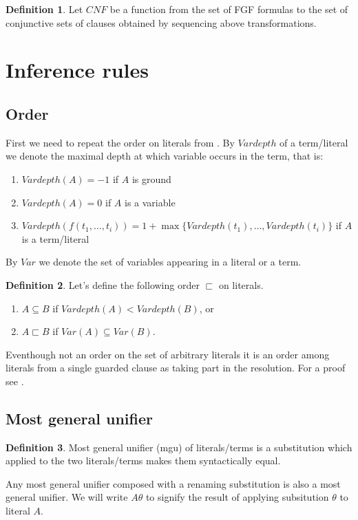 \documentclass[english, shortabstract]{iithesis}
\theoremstyle{definition} \newtheorem{definition}{Definition}[chapter]
\theoremstyle{remark} \newtheorem{remark}[definition]{Observation}
\theoremstyle{plain} \newtheorem{theorem}[definition]{Theorem}
\theoremstyle{plain} \newtheorem{lemma}[definition]{Lemma}
\begin{document}
\begin{definition}
Let $CNF$ be a function from the set of FGF formulas to the set of conjunctive sets of clauses obtained by sequencing above transformations.
\end{definition}

\section{Inference rules}

\subsection{Order}

First we need to repeat the order on literals from \cite{resolution gf}.
By $Vardepth$ of a term/literal we denote the maximal depth at which variable occurs in the term, that is:
\begin{enumerate}
    \item $Vardepth(A)=-1$ if $A$ is ground
    \item $Vardepth(A)=0$ if $A$ is a variable
    \item $Vardepth(f(t_1,\dots, t_i))=1+\max\{Vardepth(t_1), \dots, Vardepth(t_i)\}$ if $A$ is a term/literal
\end{enumerate}
By $Var$ we denote the set of variables appearing in a literal or a term.
\begin{definition}
Let's define the following order $\sqsubset$ on literals.
\begin{enumerate}
    \item $A \subseteq B$ if $Vardepth(A) < Vardepth(B)$, or
    \item $A \sqsubset B$ if $Var(A) \subseteq Var(B)$.
\end{enumerate}
\end{definition}
Eventhough not an order on the set of arbitrary literals it is an order among literals from a single guarded clause as taking part in the resolution.
For a proof see \cite{resolution gf}.

\subsection{Most general unifier}

\begin{definition}
Most general unifier (mgu) of literals/terms is a substitution which applied to the two literals/terms makes them syntactically equal. 
\end{definition}
Any most general unifier composed with a renaming substitution is also a most general unifier.
We will write $A\theta$ to signify the result of applying subsitution $\theta$ to literal $A$.
\end{document}
